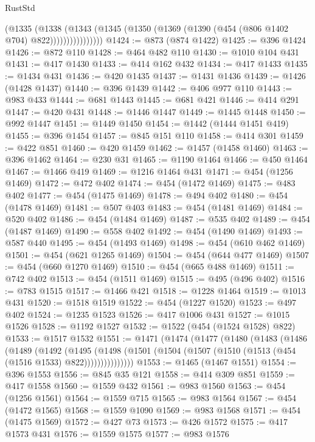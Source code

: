 \begin{lexlean}{RustStd}
\begin{coremodule}
{\begin{coremodule}
{{{{{{{{{{{{{{{{{{{{{{{{{{{{{{{{                    (@1335
                      (@1338
                        (@1343
                          (@1345 (@1350 (@1369 (@1390 (@454 (@806 @1402 @704) @822))))))))))))))))
@1424 := @873 (@874 @1422)
@1425 := @396 @1424
@1426 := @872 @110
@1428 := @464 @482 @110
@1430 := @1010 @104 @431
@1431 := @417 @1430
@1433 := @414 @162 @432
@1434 := @417 @1433
@1435 := @1434 @431
@1436 := @420 @1435
@1437 := @1431 @1436
@1439 := @1426 (@1428 @1437)
@1440 := @396 @1439
@1442 := @406 @977 @110
@1443 := @983 @433
@1444 := @681 @1443
@1445 := @681 @421
@1446 := @414 @291
@1447 := @420 @431
@1448 := @1446 @1447
@1449 := @1445 @1448
@1450 := @992 @1447
@1451 := @1449 @1450
@1454 := @1442 (@1444 @1451 @419)
@1455 := @396 @1454
@1457 := @845 @151 @110
@1458 := @414 @301
@1459 := @422 @851
@1460 := @420 @1459
@1462 := @1457 (@1458 @1460)
@1463 := @396 @1462
@1464 := @230 @31
@1465 := @1190 @1464
@1466 := @450 @1464
@1467 := @1466 @419
@1469 := @1216 @1464 @431
@1471 := @454 (@1256 @1469)
@1472 := @472 @402
@1474 := @454 (@1472 @1469)
@1475 := @483 @402
@1477 := @454 (@1475 @1469)
@1478 := @494 @402
@1480 := @454 (@1478 @1469)
@1481 := @507 @403
@1483 := @454 (@1481 @1469)
@1484 := @520 @402
@1486 := @454 (@1484 @1469)
@1487 := @535 @402
@1489 := @454 (@1487 @1469)
@1490 := @558 @402
@1492 := @454 (@1490 @1469)
@1493 := @587 @440
@1495 := @454 (@1493 @1469)
@1498 := @454 (@610 @462 @1469)
@1501 := @454 (@621 @1265 @1469)
@1504 := @454 (@644 @477 @1469)
@1507 := @454 (@660 @1270 @1469)
@1510 := @454 (@665 @488 @1469)
@1511 := @742 @402
@1513 := @454 (@1511 @1469)
@1515 := @495 (@496 @402)
@1516 := @783 @1515
@1517 := @1466 @421
@1518 := @1228 @1464
@1519 := @1013 @431
@1520 := @1518 @1519
@1522 := @454 (@1227 @1520)
@1523 := @497 @402
@1524 := @1235 @1523
@1526 := @417 @1006 @431
@1527 := @1015 @1526
@1528 := @1192 @1527
@1532 := @1522 (@454 (@1524 @1528) @822)
@1533 := @1517 @1532
@1551 := @1471
    (@1474
      (@1477
        (@1480
          (@1483
            (@1486
              (@1489
                (@1492
                  (@1495
                    (@1498
                      (@1501 (@1504 (@1507 (@1510 (@1513 (@454 (@1516 @1533) @822)))))))))))))))
@1553 := @1465 (@1467 @1551)
@1554 := @396 @1553
@1556 := @845 @35 @121
@1558 := @414 @309 @851
@1559 := @417 @1558
@1560 := @1559 @432
@1561 := @983 @1560
@1563 := @454 (@1256 @1561)
@1564 := @1559 @715
@1565 := @983 @1564
@1567 := @454 (@1472 @1565)
@1568 := @1559 @1090
@1569 := @983 @1568
@1571 := @454 (@1475 @1569)
@1572 := @427 @73
@1573 := @426 @1572
@1575 := @417 @1573 @431
@1576 := @1559 @1575
@1577 := @983 @1576
}}}}}}}}}}}}}}}}}}}}}}}}}}}}}}}}
\end{coremodule}}
\end{coremodule}
\end{lexlean}
